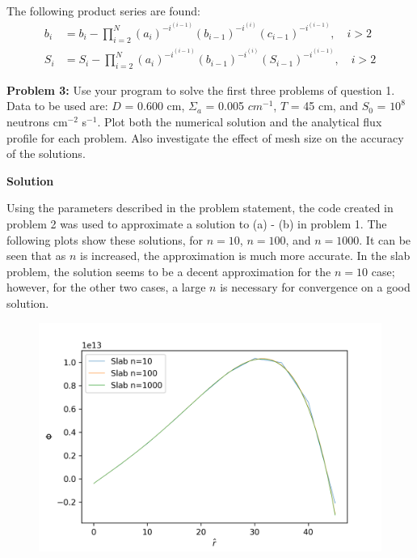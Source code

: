 \documentclass{amsart}
\theoremstyle{definition}
\begin{document}
The following product series are found:
\begin{align*}
    b_i &= b_i - \prod_{i = 2}^{N} (a_i)^{-i^{(i-1)}} (b_{i-1})^{-i^{(i)}} (c_{i-1})^{-i^{(i-1)}}, \quad i>2 \\
    S_i &= S_i - \prod_{i = 2}^{N} (a_i)^{-i^{(i-1)}} (b_{i-1})^{-i^{(i)}} (S_{i-1})^{-i^{(i-1)}}, \quad i>2
\end{align*}
 


\newpage
\textbf{Problem 3:} Use your program to solve the first three problems of question 1.
Data to be used are: $D$ = 0.600 cm, $\Sigma_a$ = 0.005 $cm^{-1}$, $T$ = 45 cm, and $S_0$ = $10^8$ neutrons cm${}^{-2}$ s${}^{-1}$.
Plot both the numerical solution and the analytical flux profile for each problem.
Also investigate the effect of mesh size on the accuracy of the solutions.

\bigbreak
\textbf{Solution}

Using the parameters described in the problem statement, the code created in problem 2 was used to approximate a solution to (a) - (b) in problem 1.
The following plots show these solutions, for $n=10$, $n=100$, and $n=1000$.
It can be seen that as $n$ is increased, the approximation is much more accurate.
In the slab problem, the solution seems to be a decent approximation for the $n=10$ case; however, for the other two cases, a large $n$ is necessary for convergence on a good solution.


\begin{figure}[h!]
    \includegraphics[width=.7\linewidth]{slab}
\end{figure}
\end{document}
